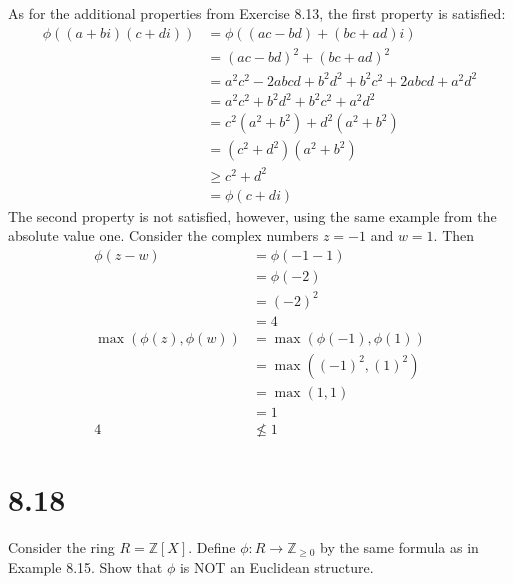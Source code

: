 \documentclass[fleqn]{article}
\begin{document}
        As for the additional properties from Exercise 8.13, the first property is satisfied:
        \begin{align}
            \phi((a + bi)(c + di)) &= \phi((ac - bd) + (bc + ad)i) \\
                &= (ac - bd)^2 + (bc + ad)^2 \\
                &= a^2c^2 - 2abcd + b^2d^2 + b^2c^2 + 2abcd + a^2d^2 \\
                &= a^2c^2 + b^2d^2 + b^2c^2 + a^2d^2 \\
                &= c^2 \left(a^2 + b^2\right) + d^2 \left(a^2 + b^2\right) \\
                &= \left(c^2 + d^2\right) \left(a^2 + b^2\right) \\
                &\geq c^2 + d^2 \\
                &= \phi(c + di)
        \end{align}
        The second property is not satisfied, however, using the same example from the absolute value one.  Consider the complex numbers $z = -1$ and $w = 1$.  Then
        \begin{align}
            \phi(z - w) &= \phi(-1 - 1) \\
                &= \phi(-2) \\
                &= (-2)^2 \\
                &= 4 \\
            \max(\phi(z), \phi(w)) &= \max(\phi(-1), \phi(1)) \\
                &= \max((-1)^2, (1)^2) \\
                &= \max(1, 1) \\
                &= 1 \\
            4 &\not\leq 1
        \end{align}
    
    \section{8.18}
    Consider the ring $R = \mathbb{Z}[X]$.  Define $\phi: R \to \mathbb{Z}_{\geq 0}$ by the same formula as in Example 8.15.  Show that $\phi$ is NOT an Euclidean structure.
        
\end{document}
